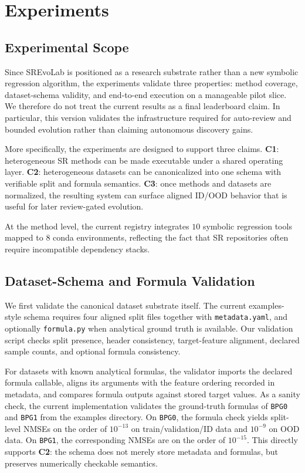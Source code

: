\section{Experiments}

\subsection{Experimental Scope}

Since SREvoLab is positioned as a research substrate rather than a new symbolic regression algorithm, the experiments validate three properties: method coverage, dataset-schema validity, and end-to-end execution on a manageable pilot slice. We therefore do not treat the current results as a final leaderboard claim. In particular, this version validates the infrastructure required for auto-review and bounded evolution rather than claiming autonomous discovery gains.

More specifically, the experiments are designed to support three claims. \textbf{C1}: heterogeneous SR methods can be made executable under a shared operating layer. \textbf{C2}: heterogeneous datasets can be canonicalized into one schema with verifiable split and formula semantics. \textbf{C3}: once methods and datasets are normalized, the resulting system can surface aligned ID/OOD behavior that is useful for later review-gated evolution.

At the method level, the current registry integrates $10$ symbolic regression tools mapped to $8$ conda environments, reflecting the fact that SR repositories often require incompatible dependency stacks.

\subsection{Dataset-Schema and Formula Validation}

We first validate the canonical dataset substrate itself. The current examples-style schema requires four aligned split files together with \texttt{metadata.yaml}, and optionally \texttt{formula.py} when analytical ground truth is available. Our validation script checks split presence, header consistency, target-feature alignment, declared sample counts, and optional formula consistency.

For datasets with known analytical formulas, the validator imports the declared formula callable, aligns its arguments with the feature ordering recorded in metadata, and compares formula outputs against stored target values. As a sanity check, the current implementation validates the ground-truth formulas of \texttt{BPG0} and \texttt{BPG1} from the examples directory. On \texttt{BPG0}, the formula check yields split-level NMSEs on the order of $10^{-13}$ on train/validation/ID data and $10^{-9}$ on OOD data. On \texttt{BPG1}, the corresponding NMSEs are on the order of $10^{-15}$. This directly supports \textbf{C2}: the schema does not merely store metadata and formulas, but preserves numerically checkable semantics.

